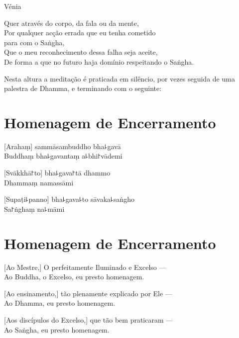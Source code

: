 \enlargethispage{\baselineskip}

\vfill

\begin{instruction}
  Vénia
\end{instruction}

Quer através do corpo, da fala ou da mente,\\
Por qualquer acção errada que eu tenha cometido\\
\vin para com o Saṅgha,\\
Que o meu reconhecimento dessa falha seja aceite,\\
De forma a que no futuro haja domínio respeitando o Saṅgha.

\begin{instruction}
  Nesta altura a meditação é praticada em silêncio, por vezes seguida de uma palestra de Dhamma, e terminando com o seguinte:
\end{instruction}

\clearpage

\chapter*{Homenagem de Encerramento}

\delegateSetUseNext

[Arahaṃ] sammāsambuddho bha꜕gavā\\
Buddhaṃ bha꜕gavantaṃ a꜕bhi꜓vādemi 

[Svākkhā꜓to] bha꜕gava꜓tā dhammo\\
Dhammaṃ namassāmi 

[Supaṭi꜕panno] bha꜕gava꜕to sāvaka꜕saṅgho\\
Sa꜓ṅghaṃ na꜕māmi 

\clearpage

\chapter{Homenagem de Encerramento}

[Ao Mestre,] O perfeitamente Iluminado e Excelso ---\\
Ao Buddha, o Excelso, eu presto homenagem. 

[Ao ensinamento,] tão plenamente explicado por Ele ---\\
Ao Dhamma, eu presto homenagem. 

[Aos discípulos do Excelso,] que tão bem praticaram ---\\
Ao Saṅgha, eu presto homenagem. 

